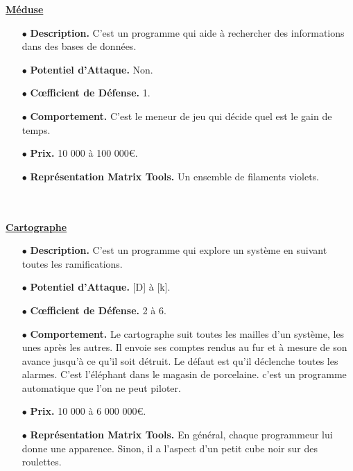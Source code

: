 \documentclass[11pt,twoside,a4paper]{article}
\begin{document}
\begin{multicols*}{2}
\underline{\textbf{M{\'e}duse}} %
\begin{itemize}
	\item[$\bullet$] \textbf{Description. }C'est un programme qui aide {\`a} rechercher des informations dans des bases de donn{\'e}es. 
	\item[$\bullet$] \textbf{Potentiel d'Attaque. }Non. 
	\item[$\bullet$] \textbf{C\oe fficient de D{\'e}fense. }1. 
	\item[$\bullet$] \textbf{Comportement. }C'est le meneur de jeu qui d{\'e}cide quel est le gain de temps. 
	\item[$\bullet$] \textbf{Prix. }10 000 {\`a} 100 000\euro. 
	\item[$\bullet$] \textbf{Repr{\'e}sentation Matrix Tools. }Un ensemble de filaments violets. 
\end{itemize} ~\\

\vfill ~\\

\underline{\textbf{Cartographe}} %
\begin{itemize}
	\item[$\bullet$] \textbf{Description. }C'est un programme qui explore un syst{\`e}me en suivant toutes les ramifications. 
	\item[$\bullet$] \textbf{Potentiel d'Attaque. }[D] {\`a} [k]. 
	\item[$\bullet$] \textbf{C\oe fficient de D{\'e}fense. }2 {\`a} 6. 
	\item[$\bullet$] \textbf{Comportement. }Le cartographe suit toutes les mailles d'un syst{\`e}me, les unes apr{\`e}s les autres. Il envoie ses comptes rendus au fur et {\`a} mesure de son avance jusqu'{\`a} ce qu'il soit d{\'e}truit. Le d{\'e}faut est qu'il d{\'e}clenche toutes les alarmes. C'est l'{\'e}l{\'e}phant dans le magasin de porcelaine. c'est un programme automatique que l'on ne peut piloter. 
	\item[$\bullet$] \textbf{Prix. }10 000 {\`a} 6 000 000\euro. 
	\item[$\bullet$] \textbf{Repr{\'e}sentation Matrix Tools. }En g{\'e}n{\'e}ral, chaque programmeur lui donne une apparence. Sinon, il a l'aspect d'un petit cube noir sur des roulettes. 
\end{itemize}%


\end{multicols*}
\end{document}
